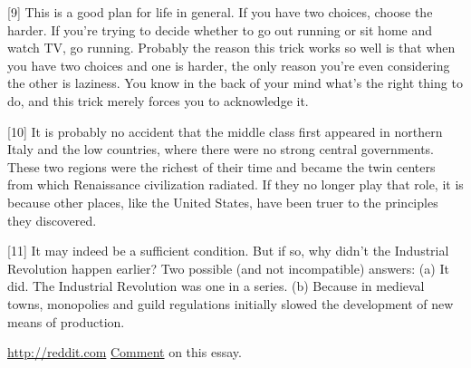 [9] This is a good plan for life in general. If you have two
                    choices, choose the harder. If you're trying to decide
                    whether to go out running or sit home and watch TV, go
                    running. Probably the reason this trick works so well is
                    that when you have two choices and one is harder, the only
                    reason you're even considering the other is laziness. You
                    know in the back of your mind what's the right thing to do,
                    and this trick merely forces you to acknowledge it.

[10] It is probably no accident that the middle class first
                    appeared in northern Italy and the low countries, where
                    there were no strong central governments. These two regions
                    were the richest of their time and became the twin centers
                    from which Renaissance civilization radiated. If they no
                    longer play that role, it is because other places, like the
                    United States, have been truer to the principles they
                    discovered.

[11] It may indeed be a sufficient condition. But if so, why
                    didn't the Industrial Revolution happen earlier? Two
                    possible (and not incompatible) answers: (a) It did. The
                    Industrial Revolution was one in a series. (b) Because in
                    medieval towns, monopolies and guild regulations initially
                    slowed the development of new means of production.

\href{http://reddit.com}{http://reddit.com}
                    \href{http://reddit.com/info?id=20775}{ Comment} on
                    this essay.




                    
                    



              
            
          
